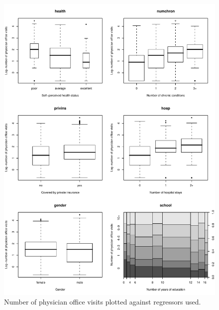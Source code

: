 \documentclass{Z}
\begin{document}
\begin{figure}[p]
\begin{center}
\includegraphics{countreg-ofp2-plot1}
\caption{\label{fig:ofp2} Number of physician office visits plotted against regressors used.}
\end{center}
\end{figure}
\end{document}
